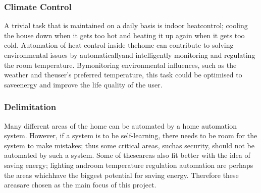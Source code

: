 \subsubsection{Climate Control}
\label{sub:Clitemate Control}
A trivial task that is maintained on a daily basis is indoor heatcontrol; cooling the house down when it gets too hot and heating it up again when it gets too cold. Automation of heat control inside thehome can contribute to solving environmental issues by automaticallyand intelligently monitoring and regulating the room temperature. Bymonitoring environmental influences, such as the weather and theuser's preferred temperature, this task could be optimised to saveenergy and improve the life quality of the user.

\subsubsection{Delimitation}
Many different areas of the home can be automated by a home automation system. However, if a system is to be self-learning, there needs to be room for the system to make mistakes; thus some critical areas, suchas security, should not be automated by such a system. Some of theseareas also fit better with the idea of saving energy; lighting androom temperature regulation automation are perhaps the areas whichhave the biggest potential for saving energy. Therefore these areasare chosen as the main focus of this project.
